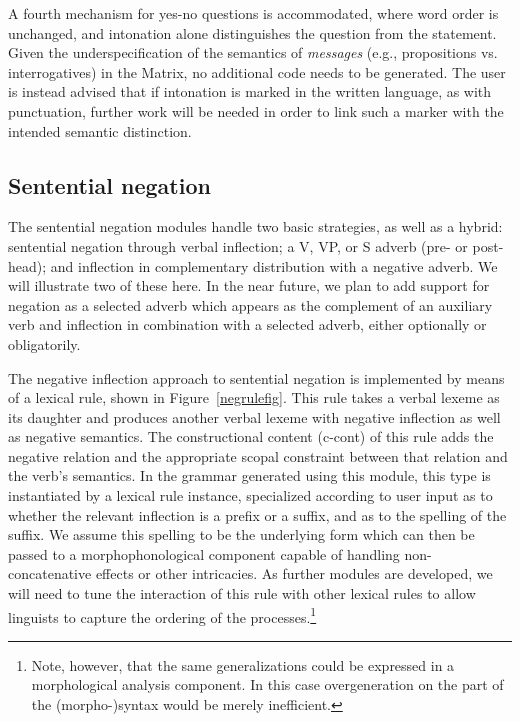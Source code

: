 \documentclass[11pt]{article}
\begin{document}
A fourth mechanism for yes-no questions is accommodated, where word order is
unchanged, and intonation alone distinguishes the question from the statement.
Given the underspecification of the semantics of {\it messages} (e.g.,
propositions vs. interrogatives) in the Matrix, no additional code needs to
be generated.  The user is instead advised that if intonation is marked in 
the written language, as with punctuation, further work will be needed in order
to link such a marker with the intended semantic distinction.

\subsection{Sentential negation}

The sentential negation modules handle two basic strategies, as well
as a hybrid: sentential negation through verbal inflection; a V,
VP, or S adverb (pre- or post-head); and inflection in complementary
distribution with a negative adverb. We will illustrate two of these
here.  In the near future, we plan to add support for negation as a
selected adverb which appears as the complement of an auxiliary verb 
and inflection in combination with a selected adverb,
either optionally or obligatorily.

The negative inflection approach to sentential negation is implemented
by means of a lexical rule, shown in Figure~\ref{negrulefig}.  This
rule takes a verbal lexeme as its daughter and produces another verbal
lexeme with negative inflection as well as negative semantics.  The
constructional content ({\sc c-cont}) of this rule adds the negative
relation and the appropriate scopal constraint between that relation
and the verb's semantics. In the grammar generated using this module,
this type is instantiated by a lexical rule instance, specialized
according to user input as to whether the relevant inflection is a
prefix or a suffix, and as to the spelling of the suffix.  We assume
this spelling to be the underlying form which can then be passed to a
morphophonological component capable of handling non-concatenative
effects or other intricacies.  As further modules are developed, we
will need to tune the interaction of this rule with other lexical
rules to allow linguists to capture the ordering of the
processes.\footnote{Note, however, that the same generalizations could be
expressed in a morphological analysis component.  In this case
overgeneration on the part of the (morpho-)syntax would be merely
inefficient.}
\end{document}
